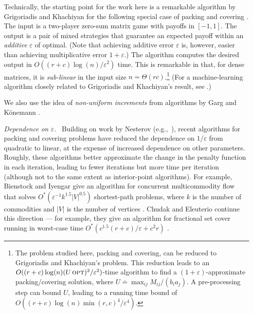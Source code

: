 \documentclass[11pt]{svjour3} \usepackage{fullpage}
\renewcommand{\paragraph}[1]{\smallskip\vspace{2pt}\par{\em #1}~}
\newcommand{\MM}{M}
\newcommand{\eps}{\varepsilon}
\newcommand{\opt}{\mbox{{\sc opt}}}
\newcommand{\rows}{r}
\newcommand{\columns}{c}
\newcommand{\inputsize}{n}
\begin{document}
Technically, the starting point for the work here is a remarkable algorithm by Grigoriadis and Khachiyan for the following special case of packing and covering \cite{Grigoriadis95Sublinear}.
The input is a two-player zero-sum matrix game with payoffs in $[-1,1]$.
The output is a pair of mixed strategies that guarantee an expected payoff within an {\em additive} $\eps$ of optimal.   (Note that achieving additive error $\eps$ is, however, easier than achieving multiplicative error $1+\eps$.)
The algorithm computes the desired output 
in $O((\rows+\columns)\log(\inputsize)/\eps^2)$ time.
This is remarkable in that, for dense matrices, it is {\em sub-linear} in the input size $n = \Theta(r c)$.\footnote{
The problem studied here, packing and covering, can be reduced to Grigoriadis and Khachiyan's problem.  This reduction leads to an $O((\rows+\columns)\log(\inputsize)(U\,\opt)^2/\eps^2)$-time algorithm to find a $(1+\eps)$-approximate packing/covering solution,
where $U\doteq\max_{ij} \MM_{ij}/(b_i a_j)$.
A pre-processing step \cite[\S2.1]{Luby93Parallel} can bound $U$,
leading to a running time bound of $O((\rows+\columns)\log(\inputsize)\min(r,c)^4/\eps^4)$.}
(For a machine-learning algorithm closely related to Grigoriadis and Khachiyan's result,
see \cite{clarkson2010sublinear,clarkson2012machine}.)

We also use the idea of {\em non-uniform increments}
from algorithms by Garg and K\"onemann
\cite{Garg98Faster,Konemann98Fast,garg2007faster}.

\paragraph{Dependence on $\eps$.}
Building on work by Nesterov (e.g.,~\cite{nesterov2005smooth,nesterov2009unconstrained}),
recent algorithms for packing and covering problems
have reduced the dependence on $1/\eps$ from quadratic to linear, 
at the expense of increased dependence on other parameters.
Roughly, these algorithms better approximate the change in the penalty function in each iteration, leading to fewer iterations but more time per iteration
(although not to the same extent as interior-point algorithms).
For example, Bienstock and Iyengar give an algorithm for concurrent multicommodity flow that solves $O^*(\eps^{-1} k^{1.5}|V|^{0.5})$ shortest-path problems, where $k$ is the number of commodities and $|V|$ is the number of vertices \cite{Bienstock04Solving}.  
Chudak and Eleuterio continue this direction --- for example, they give an algorithm for fractional set cover running in worst-case time $O^*(\columns^{1.5}(\rows+\columns)/\eps + \columns^2\rows)$ \cite{chudak2005ias}.
\end{document}

